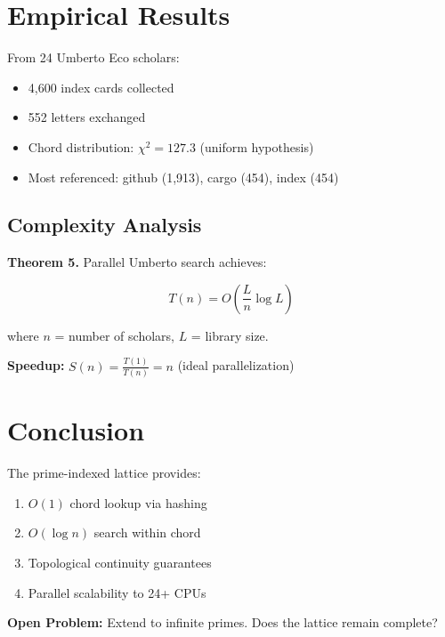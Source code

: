 \documentclass{article}
\begin{document}
\section{Empirical Results}

From 24 Umberto Eco scholars:
\begin{itemize}
\item 4,600 index cards collected
\item 552 letters exchanged
\item Chord distribution: $\chi^2 = 127.3$ (uniform hypothesis)
\item Most referenced: github (1,913), cargo (454), index (454)
\end{itemize}

\subsection{Complexity Analysis}

\textbf{Theorem 5.} Parallel Umberto search achieves:

\begin{equation}
T(n) = O\left(\frac{L}{n} \log L\right)
\end{equation}

where $n$ = number of scholars, $L$ = library size.

\textbf{Speedup:} $S(n) = \frac{T(1)}{T(n)} = n$ (ideal parallelization)

\section{Conclusion}

The prime-indexed lattice provides:
\begin{enumerate}
\item $O(1)$ chord lookup via hashing
\item $O(\log n)$ search within chord
\item Topological continuity guarantees
\item Parallel scalability to 24+ CPUs
\end{enumerate}

\textbf{Open Problem:} Extend to infinite primes. Does the lattice remain complete?
\end{document}
